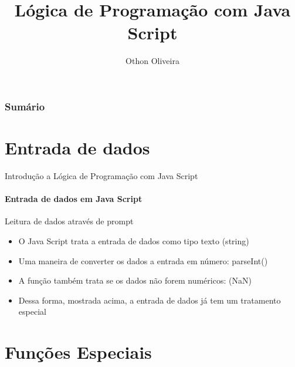 \documentclass[13pt, xcolor={dvipsnames,svgnames}, portuguese]{beamer}
\author{Othon Oliveira}
\title{Lógica de Programação com Java Script}
\institute{SENAC - PROA}
\date{}
\begin{document}
\begin{frame}
\titlepage
\end{frame}

\newcommand{\capa}{
    \begin{tikzpicture}[remember picture,overlay]
        \node at (current page.south west)
            {\begin{tikzpicture}[remember picture, overlay]
                \fill[shading=radial,top color=orange,bottom color=orange,middle color=yellow] (0,0) rectangle (\paperwidth,\paperheight);
            \end{tikzpicture}
          };
    \end{tikzpicture}
}

\begin{frame}\frametitle{Sumário}
\tableofcontents
\end{frame}


\section{Entrada de dados}
\begin{frame}{Introdução a Lógica de Programação com Java Script}
\framesubtitle{ Entrada de dados em Java Script}
	\begin{block}{Leitura de dados através de prompt}
		\begin{itemize}
		  \item[a.] O Java Script trata a entrada de dados como tipo texto (string)
		  \pause
		  \item[b.] Uma maneira de converter os dados a entrada em número: parseInt()
		   \pause		  
		  \item[c.] A função também trata se os dados não forem numéricos: (NaN)
		  \pause
		  \item[d.] Dessa forma, mostrada acima, a entrada de dados já tem um tratamento especial
		\end{itemize}
	\end{block} 
\end{frame}


\section{Funções Especiais}
\end{document}
